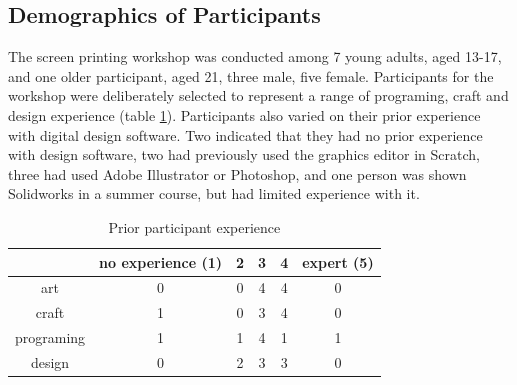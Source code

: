 \documentclass{sigchi}
\newcommand\tabhead[1]{\small\textbf{#1}}
\begin{document}
\subsection{Demographics of Participants}
The screen printing workshop was conducted among 7 young adults, aged 13-17, and one older participant, aged 21, three male, five female. Participants for the workshop were deliberately selected to represent a range of programing, craft and design experience (table \ref{table:experience}). Participants also varied on their prior experience with digital design software. Two indicated that they had no prior experience with design software, two had previously used the graphics editor in Scratch, three had used Adobe Illustrator or Photoshop, and one person was shown Solidworks in a summer course, but had limited experience with it.
\begin{table}
  \centering
  \begin{tabular}{|c|c|c|c|c|c|}
    \hline
    \multicolumn{1}{|p{0.75cm}|}{\centering\tabhead{}} &
    \multicolumn{1}{|p{1.3cm}|}{\centering\small{no experience (1)}} &
    \multicolumn{1}{|p{0.75cm}|}{\centering\small{2}}&
    \multicolumn{1}{|p{0.75cm}|}{\centering\small{3}}&
    \multicolumn{1}{|p{0.75cm}|}{\centering\small{4}}&
    \multicolumn{1}{|p{0.75cm}|}{\centering\small{expert (5)}}\\
    \hline
    \small{art} & 0 & 0 & 4 & 4 & 0\\
    \hline
    \small{craft} & 1 & 0 & 3 & 4& 0  \\
    \hline
	\small{programing} & 1 & 1 & 4 & 1& 1  \\
    \hline
	\small{design} & 0 & 2 & 3 & 3& 0  \\
    \hline
  \end{tabular}
  \caption{Prior participant experience}
\label{table:experience}
\end{table}
\end{document}
